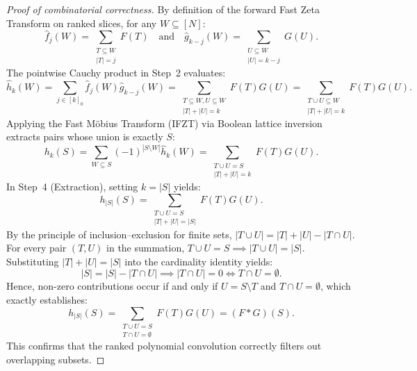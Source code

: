 \documentclass[11pt, letterpaper]{article}
\begin{document}
\begin{proof}[Proof of combinatorial correctness]
By definition of the forward Fast Zeta Transform on ranked slices, for any $W \subseteq [N]$:
\begin{equation}
    \hat{f}_j(W) = \sum_{\substack{T \subseteq W \\ |T| = j}} F(T) \quad \text{and} \quad \hat{g}_{k-j}(W) = \sum_{\substack{U \subseteq W \\ |U| = k-j}} G(U).
\end{equation}
The pointwise Cauchy product in Step~2 evaluates:
\begin{equation}
    \hat{h}_k(W) = \sum_{j \in [k]_0} \hat{f}_j(W) \hat{g}_{k-j}(W) = \sum_{\substack{T \subseteq W, U \subseteq W \\ |T| + |U| = k}} F(T) G(U) = \sum_{\substack{T \cup U \subseteq W \\ |T| + |U| = k}} F(T) G(U).
\end{equation}
Applying the Fast Möbius Transform (IFZT) via Boolean lattice inversion extracts pairs whose union is exactly $S$:
\begin{equation}
    h_k(S) = \sum_{W \subseteq S} (-1)^{|S \setminus W|} \hat{h}_k(W) = \sum_{\substack{T \cup U = S \\ |T| + |U| = k}} F(T) G(U).
\end{equation}
In Step~4 (Extraction), setting $k = |S|$ yields:
\begin{equation}
    h_{|S|}(S) = \sum_{\substack{T \cup U = S \\ |T| + |U| = |S|}} F(T) G(U).
\end{equation}
By the principle of inclusion--exclusion for finite sets, $|T \cup U| = |T| + |U| - |T \cap U|$. For every pair $(T, U)$ in the summation, $T \cup U = S \implies |T \cup U| = |S|$. Substituting $|T| + |U| = |S|$ into the cardinality identity yields:
\begin{equation}
    |S| = |S| - |T \cap U| \implies |T \cap U| = 0 \iff T \cap U = \emptyset.
\end{equation}
Hence, non-zero contributions occur if and only if $U = S \setminus T$ and $T \cap U = \emptyset$, which exactly establishes:
\begin{equation}
    h_{|S|}(S) = \sum_{\substack{T \cup U = S \\ T \cap U = \emptyset}} F(T) G(U) = (F * G)(S).
\end{equation}
This confirms that the ranked polynomial convolution correctly filters out overlapping subsets.
\end{proof}
\end{document}
